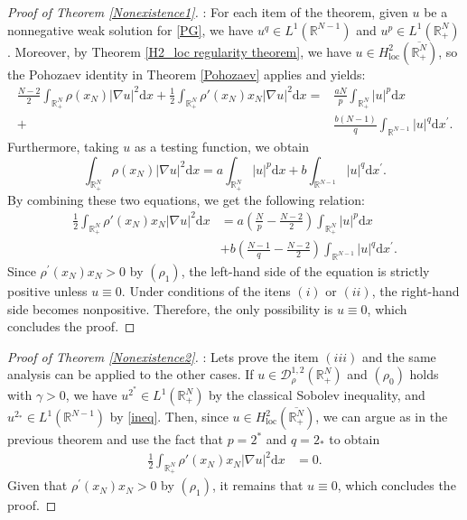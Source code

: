 \documentclass[12pt,reqno]{amsart}
\begin{document}
\begin{proof}[Proof of Theorem \ref{Nonexistence1}]: For each item of the theorem, given $u$ be a nonnegative weak solution for \eqref{PG}, we have $u^q\in L^1(\mathds{R}^{N-1})$ and $u^p\in L^1(\mathds{R}^N_+)$. Moreover, by Theorem \ref{H2_loc regularity theorem}, we have $u\in H^2_{\mathrm{loc}}(\overline{\mathds{R}^N_+})$, so the Pohozaev identity in Theorem \ref{Pohozaev} applies and yields:
\begin{align*}
     \frac{N-2}{2}\int_{\mathds{R}_{+}^{N}}\rho(x_N)|\nabla u|^2\mathrm{d}x+\frac{1}{2}\int_{\mathds{R}_{+}^{N}}\rho'(x_N)x_N|\nabla u|^2\mathrm{d}x=&\frac{aN}{p}\int_{\mathds{R}^N_+}|u|^p\mathrm{d}x\\
     +&\frac{b(N-1)}{q}\int_{\mathds{R}^{N-1}}|u|^q\mathrm{d}x^\prime.
\end{align*}
Furthermore, taking $u$ as a testing function, we obtain
\begin{equation*}
    \int_{\mathds{R}^N_+}\rho(x_N)|\nabla u|^2\mathrm{d}x=a\int_{\mathds{R}^N_+}|u|^p\mathrm{d}x+b\int_{\mathds{R}^{N-1}}|u|^q\mathrm{d}x^\prime.
\end{equation*}
By combining these two equations, we get the following relation:
\begin{align*}
    \frac{1}{2}\int_{\mathds{R}^N_+}\rho'(x_N)x_N|\nabla u|^2\mathrm{d}x&=a\left(\frac{N}{p}-\frac{N-2}{2}\right)\int_{\mathds{R}^{N}_+}|u|^p\mathrm{d}x\\
    &+b\left(\frac{N-1}{q}-\frac{N-2}{2}\right)\int_{\mathds{R}^{N-1}}|u|^q\mathrm{d}x^\prime.
\end{align*}
Since $\rho^\prime(x_N)x_N>0$ by $(\rho_1)$, the left-hand side of the equation is strictly positive unless $u\equiv 0$. Under conditions of the itens $(i)$ or $(ii)$,  the right-hand side becomes nonpositive. Therefore, the only possibility is $u\equiv 0$, which concludes the proof.
\end{proof}

\begin{proof}[Proof of Theorem \ref{Nonexistence2}]: Lets prove the item $(iii)$ and the same analysis can be applied to the other cases. If $u \in \mathcal{D}^{1,2}_\rho(\mathds{R}^N_+)$ and $(\rho_0)$ holds with $\gamma>0$, we have $u^{2^\ast}\in L^1(\mathds{R}^N_+)$ by the classical Sobolev inequality, and $u^{2_\ast}\in L^1(\mathds{R}^{N-1})$ by \eqref{ineq}. Then, since $u\in H^2_{\mathrm{loc}}(\overline{\mathds{R}^N_+})$, we can argue as in the previous theorem and use the fact that $p=2^\ast$ and $q=2_\ast$ to obtain
\begin{align*}
    \frac{1}{2}\int_{\mathds{R}^N_+}\rho'(x_N)x_N|\nabla u|^2\mathrm{d}x&=0.
\end{align*}
Given that $\rho^\prime(x_N)x_N>0$ by $(\rho_1)$, it remains that $u\equiv 0$, which concludes the proof.    
\end{proof}
\end{document}
